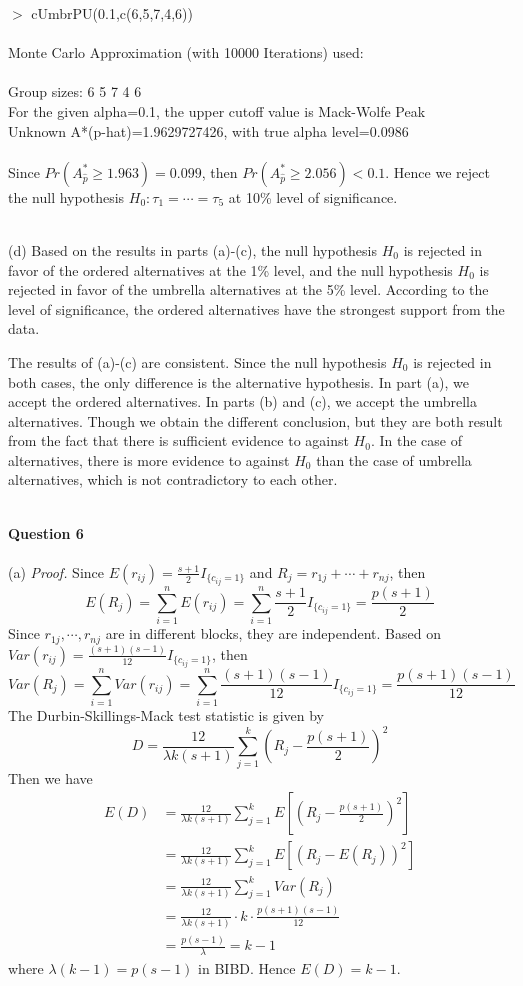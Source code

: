 \documentclass[12pt,a4paper]{article}
\begin{document}
\indent $>$ cUmbrPU(0.1,c(6,5,7,4,6))\\
~\\
\indent Monte Carlo Approximation (with 10000 Iterations) used:\\
~\\
\indent Group sizes: 6 5 7 4 6\\
\indent For the given alpha=0.1, the upper cutoff value is Mack-Wolfe Peak\\ 
\indent Unknown A*(p-hat)=1.9629727426, with true alpha level=0.0986\\
~\\
Since $Pr(A_{\hat{p}}^{*}\geqslant1.963)=0.099$, then $Pr(A_{\hat{p}}^{*}\geqslant2.056)<0.1$. Hence we reject the null hypothesis $H_{0}:\tau_{1}=\cdots=\tau_{5}$ at 10\% level of significance.

~\\
(d) Based on the results in parts (a)-(c), the null hypothesis $H_{0}$ is rejected in favor of the ordered alternatives at the 1\% level, and the null hypothesis $H_{0}$ is rejected in favor of the umbrella alternatives at the 5\% level. According to the level of significance, the ordered alternatives have the strongest support from the data.

The results of (a)-(c) are consistent. Since the null hypothesis $H_{0}$ is rejected in both cases, the only difference is the alternative hypothesis. In part (a), we accept the ordered alternatives. In parts (b) and (c), we accept the umbrella alternatives. Though we obtain the different conclusion, but they are both result from the fact that there is sufficient evidence to against $H_{0}$. In the case of alternatives, there is more evidence to against $H_{0}$ than the case of umbrella alternatives, which is not contradictory to each other.

~\\
\indent \textbf{Question 6}\\
~\\
(a) \textit{Proof.} Since $E(r_{ij})=\frac{s+1}{2}I_{\{c_{ij}=1\}}$ and $R_{j}=r_{1j}+\cdots+r_{nj}$, then
$$E(R_{j})=\sum_{i=1}^{n}E(r_{ij})=\sum_{i=1}^{n}\frac{s+1}{2}I_{\{c_{ij}=1\}}=\frac{p(s+1)}{2}$$
Since $r_{1j},\cdots,r_{nj}$ are in different blocks, they are independent. Based on $Var(r_{ij})=\frac{(s+1)(s-1)}{12}I_{\{c_{ij}=1\}}$, then
$$Var(R_{j})=\sum_{i=1}^{n}Var(r_{ij})=\sum_{i=1}^{n}\frac{(s+1)(s-1)}{12}I_{\{c_{ij}=1\}}=\frac{p(s+1)(s-1)}{12}$$
The Durbin-Skillings-Mack test statistic is given by
$$D=\frac{12}{\lambda k(s+1)}\sum_{j=1}^{k}\left(R_{j}-\frac{p(s+1)}{2}\right)^{2}$$
Then we have
\begin{align*}
E(D)&=\frac{12}{\lambda k(s+1)}\sum_{j=1}^{k}E\left[\left(R_{j}-\frac{p(s+1)}{2}\right)^{2}\right]\\
&=\frac{12}{\lambda k(s+1)}\sum_{j=1}^{k}E\left[\left(R_{j}-E(R_{j})\right)^{2}\right]\\
&=\frac{12}{\lambda k(s+1)}\sum_{j=1}^{k}Var(R_{j})\\
&=\frac{12}{\lambda k(s+1)}\cdot k\cdot\frac{p(s+1)(s-1)}{12}\\
&=\frac{p(s-1)}{\lambda}=k-1
\end{align*}
where $\lambda(k-1)=p(s-1)$ in BIBD. Hence $E(D)=k-1$.
\end{document}
